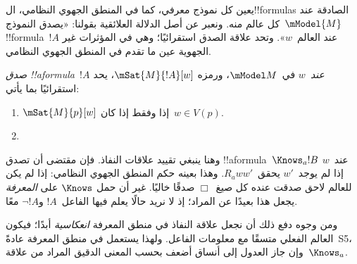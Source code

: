 \documentclass[../../../include/open-logic-section]{subfiles}
\begin{document}


يعين كل نموذج معرفي، كما في المنطق الجهوي النظامي، ال!!{formula}s الصادقة
عند كل عالم منه. ونعبر عن أصل الدلالة العلائقية بقولنا: «يصدق
النموذج~$\mModel{M}$ !!{formula}~$!A$ عند العالم~$w$». وتحد علاقة الصدق
استقرائيًا؛ وهي في المؤثرات غير الجهوية عين ما تقدم في المنطق الجهوي
النظامي.

\begin{defn}
  \emph{صدق !!a{formula}~$!A$ عند~$w$} في~$\mModel M$، ورمزه
  $\mSat{M}{!A}[w]$، يحد استقرائيًا بما يأتي:
  \begin{enumerate}
  \item $\mSat{M}{p}[w]$ إذا وفقط إذا كان~$w \in V(p)$.
  \item{}
  \end{enumerate}
\end{defn}

وهنا ينبغي تقييد علاقات النفاذ. فإن مقتضى
 أن تصدق !!a{formula}~$\Knows_a !B$ عند~$w$
إذا لم يوجد~$w'$ يحقق~$R_a ww'$. وهذا بعينه حكم المنطق الجهوي النظامي:
إذا لم يكن للعالم لاحق صدقت عنده كل صيغ~$\Box$ صدقًا خاليًا. غير أن حمل
$\Knows$ على \emph{المعرفة} يجعل هذا بعيدًا عن المراد؛ إذ لا نريد حالًا
يعلم فيها الفاعل~$!A$ و$\lnot !A$ معًا.

ومن وجوه دفع ذلك أن نجعل علاقة النفاذ في منطق المعرفة \emph{انعكاسية}
أبدًا؛ فيكون العالم الفعلي متسقًا مع معلومات الفاعل. ولهذا يستعمل في منطق
المعرفة عادةً~S5، وإن جاز العدول إلى أنساق أضعف بحسب المعنى الدقيق المراد
من علاقة~$\Knows_a$.
\end{document}
